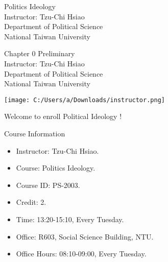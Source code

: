 \documentclass{beamer}
\title{}
\author{}
\date{}
\begin{document}
\begin{frame}
\begin{center}
\Large{Politics Ideology} \\
\vspace{3em}
\normalsize{Instructor: Tzu-Chi Hsiao} \\
\vspace{3em}
\small{Department of Political Science} \\
\vspace{1em}
\small{National Taiwan University}
\end{center}
\end{frame}
\begin{frame}
\begin{center}
\Large{Chapter 0 Preliminary} \\
\vspace{3em}
\normalsize{Instructor: Tzu-Chi Hsiao} \\
\vspace{3em}
\small{Department of Political Science} \\
\vspace{1em}
\small{National Taiwan University} \\
\end{center}
\end{frame}
\begin{frame}{}
\begin{center}
\texttt{[image: C:/Users/a/Downloads/instructor.png]}
\end{center}
\vspace{1em}
\begin{center}
\Large{Welcome to enroll Political Ideology !}
\end{center}
\end{frame}
\begin{frame}{Course Information}
\begin{itemize}
\pause
\item Instructor: Tzu-Chi Hsiao.
\pause
\item Course: Politics Ideology.
\pause
\item Course ID: PS-2003.
\pause
\item Credit: 2.
\pause
\item Time: 13:20-15:10, Every Tuesday.
\pause
\item Office: R603, Social Science Building, NTU.
\pause
\item Office Hours: 08:10-09:00, Every Tuesday.
\end{itemize}
\end{frame}
\end{document}
